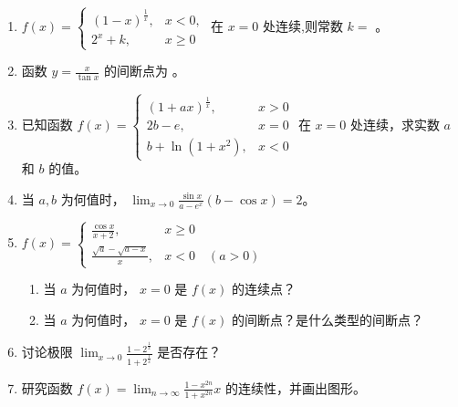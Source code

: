 \documentclass[12pt, a4paper]{article}
\begin{document}
\begin{enumerate}
    \item $ f(x)=\begin{cases}(1-x)^{\frac{1}{x}}, & x<0,\\ 2^{x}+k, & x\geq0\end{cases} $ 在 $ x=0 $ 处连续,则常数 $ k= $ \underline{\hspace{2cm}}。

    \item 函数 $ y=\frac{x}{\tan x} $ 的间断点为 \underline{\hspace{2cm}}。

    \item 已知函数 $ f(x)=\begin{cases}(1+ax)^{\frac{1}{x}}, & x>0\\ 2b-e, & x=0\\ b+\ln(1+x^{2}), & x<0\end{cases} $ 在 $x=0$ 处连续，求实数 $a$ 和 $b$ 的值。

    \item 当 $ a, b $ 为何值时， $ \lim_{x \to 0} \frac{\sin x}{a - e^{x}} (b - \cos x) = 2 $。

    \item $ f(x) = \begin{cases} \frac{\cos x}{x+2}, & x \geq 0 \\ \frac{\sqrt{a} - \sqrt{a - x}}{x}, & x < 0 \quad (a > 0) \end{cases} $
    \begin{enumerate}
        \item 当 $a$ 为何值时， $x=0$ 是 $ f(x) $ 的连续点？
        \item 当 $a$ 为何值时， $x=0$ 是 $ f(x) $ 的间断点？是什么类型的间断点？
    \end{enumerate}

    \item 讨论极限 $ \lim_{x \to 0} \frac{1 - 2^{\frac{1}{x}}}{1 + 2^{\frac{1}{x}}} $ 是否存在？

    \item 研究函数 $ f(x)=\lim_{n\to\infty}\frac{1-x^{2n}}{1+x^{2n}}x $ 的连续性，并画出图形。
\end{enumerate}
\end{document}
